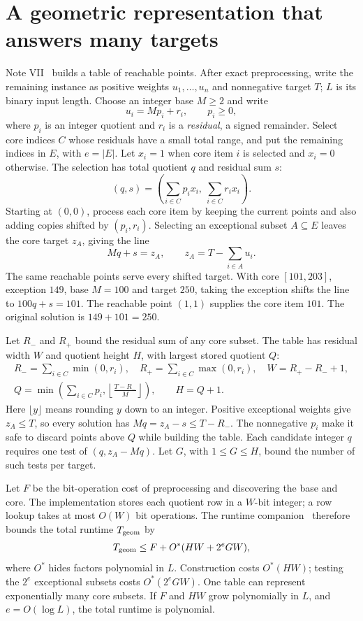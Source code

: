 \documentclass[11pt,english]{article}
\begin{document}
\section{A geometric representation that answers many targets}
Note VII~\cite{vii} builds a table of reachable points. After exact
preprocessing, write the remaining instance as positive weights
$u_1,\ldots,u_n$ and nonnegative target $T$; $L$ is its binary input length.
Choose an integer base $M\ge2$ and write
\[
 u_i=Mp_i+r_i,\qquad p_i\ge0,
\]
where $p_i$ is an integer quotient and $r_i$ is a \emph{residual}, a signed
remainder. Select core indices $C$ whose residuals have a small total
range, and put the remaining indices in $E$, with $e=|E|$.
Let $x_i=1$ when core item $i$ is selected and $x_i=0$ otherwise. The selection
has total quotient $q$ and residual sum $s$:
\[
 (q,s)=\left(\sum_{i\in C}p_ix_i,\ \sum_{i\in C}r_ix_i\right).
\]
Starting at $(0,0)$, process each core item by keeping the current points and
also adding copies shifted by $(p_i,r_i)$. Selecting an
exceptional subset $A\subseteq E$ leaves the core target $z_A$, giving the line
\[
 Mq+s=z_A,\qquad z_A=T-\sum_{i\in A}u_i.
\]
The same reachable points serve every shifted target. With core $[101,203]$, exception
$149$, base $M=100$ and target $250$, taking the exception shifts the line to
$100q+s=101$. The reachable point $(1,1)$ supplies the core item $101$.
The original solution is $149+101=250$.

Let $R_-$ and $R_+$ bound the residual sum of any core subset. The table has
residual width $W$ and quotient height $H$, with largest stored quotient $Q$:
\[
 \begin{gathered}
 R_-=\sum_{i\in C}\min(0,r_i),\quad
 R_+=\sum_{i\in C}\max(0,r_i),\quad W=R_+-R_-+1,\\
 Q=\min\left(\sum_{i\in C}p_i,
       \left\lfloor\frac{T-R_-}{M}\right\rfloor\right),\qquad H=Q+1.
 \end{gathered}
\]
Here $\lfloor y\rfloor$ means rounding $y$ down to an integer. Positive
exceptional weights give $z_A\le T$, so every solution has $Mq=z_A-s\le T-R_-$.
The nonnegative $p_i$ make it safe to discard points above $Q$ while building
the table. Each candidate integer $q$ requires one test of $(q,z_A-Mq)$.
Let $G$, with $1\le G\le H$, bound the number of such tests per target.

Let $F$ be the bit-operation cost of preprocessing and discovering the base and core.
The implementation stores each quotient row in a $W$-bit integer; a row
lookup takes at most $O(W)$ bit operations. The runtime companion~\cite{runtime}
therefore bounds the total runtime $T_{\rm geom}$ by
\[
 T_{\rm geom}\le F+O^*(HW+2^eGW),
\]
where $O^*$ hides factors polynomial in $L$. Construction costs $O^*(HW)$;
testing the $2^e$ exceptional subsets costs $O^*(2^eGW)$.
One table can represent exponentially many core subsets. If $F$ and $HW$
grow polynomially in $L$, and $e=O(\log L)$, the total runtime is polynomial.
\end{document}
